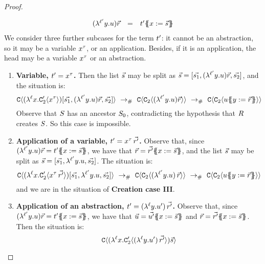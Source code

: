 \begin{proof}
\begin{enumerate}
\begin{enumerate}
\[\begin{array}{rcl}
      (\lambda^{\ell'} y. u)\vec{r} & = & t'\{\!\!\{x := \vec{s}\}\!\!\}
      \end{array}
    \]
    We consider three further subcases for the term $t'$:
    it cannot be an abstraction, so it may be a variable $x^{\tau}$,
    or an application.
    Besides, if it is an application, the head may be a variable $x^{\tau}$ or an abstraction.
    \begin{enumerate}
    \item {\bf Variable, \ie $t' = x^{\tau}$.}
      Then the list $\vec{s}$ may be split as $\vec{s} = [\vec{s_1},(\lambda^{\ell'} y. u)\vec{r},\vec{s_2}]$,
      and the situation is:
      \[
        \conof{(\lamp{\lab}{\var}{\con'_2\of{\var^{\typ}}})[\ls{\tmtwo_1},(\lamp{\labtwo}{\vartwo}{\tmthree})\ls{\tmfour},\ls{\tmtwo_2}]}
        \ \todist\ %
        \conof{\con_2\of{ (\lamp{\labtwo}{\vartwo}{\tmthree})\ls{\tmfour} }}
        \ \todist\ %
        \conof{\con_2\of{ \tmthree\sub{\vartwo}{\ls{\tmfour}} }}
      \]
      Observe that $S$ has an ancestor $S_0$, contradicting the hypothesis that $R$ creates $S$.
      So this case is impossible.
    \item {\bf Application of a variable, \ie $t' = x^{\tau}\,\vec{r'}$.}
      Observe that, since
      $(\lambda^{\ell'} y. u)\vec{r} = t'\{\!\!\{x := \vec{s}\}\!\!\}$,
      we have that $\vec{r} = \vec{r'}\{\!\!\{x := \vec{s}\}\!\!\}$,
      and the list $\vec{s}$ may be split as $\vec{s} = [\vec{s_1},\lambda^{\ell'} y. u,\vec{s_2}]$.
      The situation is:
      \[
        \conof{(\lamp{\lab}{\var}{\con_2'\of{\var^{\typ}\,\ls{\tmfour'}}})[\ls{\tmtwo_1},\lamp{\labtwo}{\vartwo}{\tmthree},\ls{\tmtwo_2}]}
        \ \todist\ %
        \conof{\con_2\of{(\lamp{\labtwo}{\vartwo}{\tmthree})\,\ls{\tmfour}}}
        \ \todist\ %
        \conof{\con_2\of{\tmthree\sub{\vartwo}{\ls{\tmfour}}}}
      \]
      and we are in the situation of {\bf Creation case III}.
    \item {\bf Application of an abstraction, \ie $t' = (\lambda^{\ell} y. u')\,\vec{r'}$.}
      Observe that, since
      $(\lambda^{\ell'} y. u)\vec{r} = t'\{\!\!\{x := \vec{s}\}\!\!\}$,
      we have that $\vec{u} = \vec{u'}\{\!\!\{x := \vec{s}\}\!\!\}$
      and $\vec{r} = \vec{r'}\{\!\!\{x := \vec{s}\}\!\!\}$.
      Then the situation is:
      \[
        \mathtt{C}\langle(\lambda^{\ell} x. \mathtt{C}_2'\langle (\lambda^{\ell} y. u')\,\vec{r'} \rangle)\vec{s}\rangle
\]
\end{enumerate}
\end{enumerate}
\end{enumerate}
\end{proof}
